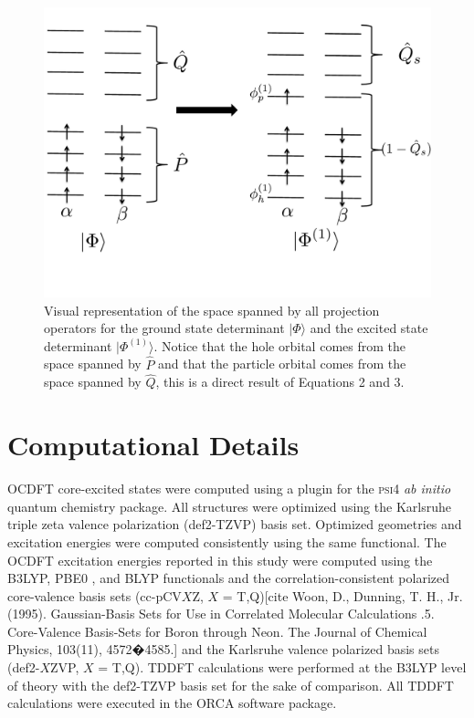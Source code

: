 \documentclass[12pt]{article}
\begin{document}
\begin{figure}
\centering
\includegraphics[scale=0.40]{Figure1.pdf}
\caption{Visual representation of the space spanned by all projection operators for the ground state determinant $|\Phi\rangle$ and the excited state determinant $|\Phi^{(1)}\rangle$. Notice that the hole orbital comes from the space spanned by $\hat{P}$ and that the particle orbital comes from the space spanned by  $\hat{Q}$, this is a direct result of Equations 2 and 3.}
\label{fig:projection}
\end{figure}


\section{Computational Details}
OCDFT core-excited states were computed using a plugin for the \textsc{psi4} \textit{ab initio} quantum chemistry package.\cite{turney_psi4:_2012}
All structures were optimized using the Karlsruhe triple zeta valence polarization (def2-TZVP) basis set.\cite{weigend_balanced_2005,weigend_accurate_2006}  Optimized geometries and excitation energies were computed consistently using the same functional. The OCDFT excitation energies reported in this study were computed using the B3LYP, \cite{becke_new_1993,lee_development_1988,vosko_accurate_1980,stephens_ab_1994} PBE0 \cite{adamo_toward_1999}, and BLYP\cite{stephens_ab_1994,miehlich_results_1989} functionals and the correlation-consistent polarized core-valence basis sets (cc-pCV$X$Z, $X$ = T,Q)[cite Woon, D.,  Dunning, T. H., Jr. (1995). Gaussian-Basis Sets for Use in Correlated Molecular Calculations .5. Core-Valence Basis-Sets for Boron through Neon. The Journal of Chemical Physics, 103(11), 4572�4585.]
and the Karlsruhe valence polarized basis sets\cite{weigend_balanced_2005,weigend_accurate_2006} (def2-$X$ZVP, $X$ = T,Q).
TDDFT calculations were performed at the B3LYP level of theory with the def2-TZVP basis set for the sake of comparison. All TDDFT calculations were executed in the ORCA software package\cite{neese_orca_2012}.
\end{document}
